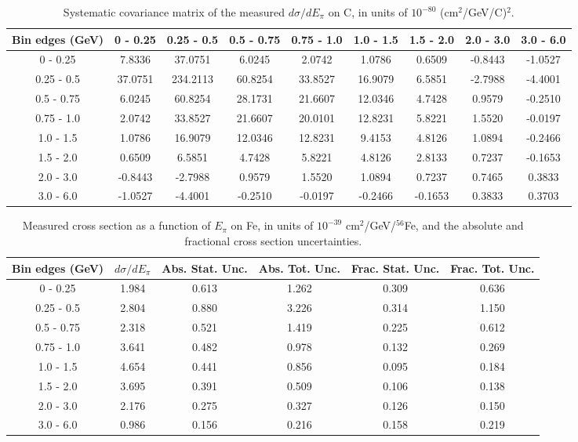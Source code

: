 \documentclass[aps,prl,twocolumn,superscriptaddress,nofootinbib]{revtex4-1}
\begin{document}
\begin{table}[h!]
  \centering
  \caption{Systematic covariance matrix of the measured $d\sigma/dE_{\pi}$ on C, in units of $10^{-80}$ (cm$^{2}$/GeV/C)$^{2}$.}
    \begin{tabular}{c||cccccccc}
      Bin edges (GeV) & 0 - 0.25 & 0.25 - 0.5 & 0.5 - 0.75 & 0.75 - 1.0 & 1.0 - 1.5 & 1.5 - 2.0 & 2.0 - 3.0 & 3.0 - 6.0 \\
\hline \hline
        0 - 0.25 &  7.8336 & 37.0751 &  6.0245 &  2.0742 &  1.0786 &  0.6509 & -0.8443 & -1.0527 \\
      0.25 - 0.5 & 37.0751 & 234.2113 & 60.8254 & 33.8527 & 16.9079 &  6.5851 & -2.7988 & -4.4001 \\
      0.5 - 0.75 &  6.0245 & 60.8254 & 28.1731 & 21.6607 & 12.0346 &  4.7428 &  0.9579 & -0.2510 \\
      0.75 - 1.0 &  2.0742 & 33.8527 & 21.6607 & 20.0101 & 12.8231 &  5.8221 &  1.5520 & -0.0197 \\
       1.0 - 1.5 &  1.0786 & 16.9079 & 12.0346 & 12.8231 &  9.4153 &  4.8126 &  1.0894 & -0.2466 \\
       1.5 - 2.0 &  0.6509 &  6.5851 &  4.7428 &  5.8221 &  4.8126 &  2.8133 &  0.7237 & -0.1653 \\
       2.0 - 3.0 & -0.8443 & -2.7988 &  0.9579 &  1.5520 &  1.0894 &  0.7237 &  0.7465 &  0.3833 \\
       3.0 - 6.0 & -1.0527 & -4.4001 & -0.2510 & -0.0197 & -0.2466 & -0.1653 &  0.3833 &  0.3703 \\
    \end{tabular}
  \label{tablecov:C_Systematic_Epi}
\end{table}

\begin{table}[h!]
  \centering
  \caption{Measured cross section as a function of $E_{\pi}$ on Fe, in units of
  $10^{-39}$ $\text{cm}^{2}$/GeV/$^{56}$Fe, and the absolute and
  fractional cross section uncertainties.}
    \begin{tabular}{c||c||c|c||c|c}
      Bin edges (GeV)  &  $d\sigma/dE_{\pi}$  &  Abs. Stat. Unc. & Abs. Tot. Unc.  &  Frac. Stat. Unc.  &  Frac. Tot. Unc. \\
      \hline\hline
        0 - 0.25 & 1.984 & 0.613 & 1.262 & 0.309 & 0.636 \\
      0.25 - 0.5 & 2.804 & 0.880 & 3.226 & 0.314 & 1.150 \\
      0.5 - 0.75 & 2.318 & 0.521 & 1.419 & 0.225 & 0.612 \\
      0.75 - 1.0 & 3.641 & 0.482 & 0.978 & 0.132 & 0.269 \\
       1.0 - 1.5 & 4.654 & 0.441 & 0.856 & 0.095 & 0.184 \\
       1.5 - 2.0 & 3.695 & 0.391 & 0.509 & 0.106 & 0.138 \\
       2.0 - 3.0 & 2.176 & 0.275 & 0.327 & 0.126 & 0.150 \\
       3.0 - 6.0 & 0.986 & 0.156 & 0.216 & 0.158 & 0.219 \\
    \end{tabular}
  \label{table:EpiXSec_Fe}
\end{table}
\end{document}
